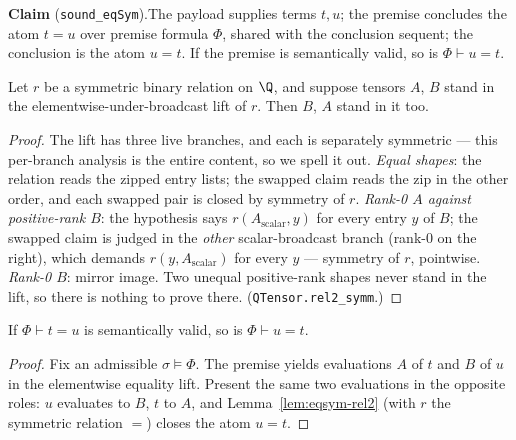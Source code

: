 

\textbf{Claim} (\texttt{sound\_eqSym}).\enspace The payload supplies
terms $t, u$; the premise concludes the atom $t = u$ over premise formula
$\Phi$, shared with the conclusion sequent; the conclusion is the atom
$u = t$. If the premise is semantically valid, so is
$\Phi \vdash u = t$.

\begin{blemma}\label{lem:eqsym-rel2}
Let $r$ be a symmetric binary relation on $\Q$, and suppose tensors $A$,
$B$ stand in the elementwise-under-broadcast lift of $r$. Then $B$, $A$
stand in it too.
\end{blemma}
\begin{proof}
The lift has three live branches, and each is separately symmetric ---
this per-branch analysis is the entire content, so we spell it out.
\emph{Equal shapes}: the relation reads the zipped entry lists; the
swapped claim reads the zip in the other order, and each swapped pair is
closed by symmetry of $r$. \emph{Rank-0 $A$ against positive-rank $B$}:
the hypothesis says $r(A_{\mathrm{scalar}}, y)$ for every entry $y$ of
$B$; the swapped claim is judged in the \emph{other} scalar-broadcast
branch (rank-0 on the right), which demands $r(y, A_{\mathrm{scalar}})$
for every $y$ --- symmetry of $r$, pointwise. \emph{Rank-0 $B$}: mirror
image. Two unequal positive-rank shapes never stand in the lift, so
there is nothing to prove there. (\texttt{QTensor.rel2\_symm}.)
\end{proof}

\begin{bthm}\label{thm:eqsym-sound}
If $\Phi \vdash t = u$ is semantically valid, so is $\Phi \vdash u = t$.
\end{bthm}
\begin{proof}
Fix an admissible $\sigma \models \Phi$. The premise yields evaluations
$A$ of $t$ and $B$ of $u$ in the elementwise equality lift. Present the
same two evaluations in the opposite roles: $u$ evaluates to $B$, $t$ to
$A$, and Lemma~\ref{lem:eqsym-rel2} (with $r$ the symmetric relation
$=$) closes the atom $u = t$.
\end{proof}

